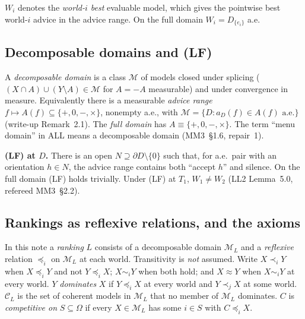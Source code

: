 \documentclass[11pt]{article}
\theoremstyle{definition}
\theoremstyle{remark}
\newcommand{\M}{\mathcal M}
\newcommand{\C}{\mathcal C}
\newcommand{\src}[1]{\textsf{#1}}
\begin{document}
$W_i$ denotes the \emph{world-$i$ best} evaluable model, which gives the pointwise best world-$i$ advice in the advice range. On the full domain $W_i=D_{\{e_i\}}$ a.e.

\subsection{Decomposable domains and (LF)}
A \emph{decomposable domain} is a class $\M$ of models closed under splicing ($(X\cap A)\cup(Y\setminus A)\in\M$ for $A=-A$ measurable) and under convergence in measure. Equivalently there is a measurable \emph{advice range} $f\mapsto A(f)\subseteq\{+,0,-,\times\}$, nonempty a.e., with $\M=\{D:a_D(f)\in A(f)\text{ a.e.}\}$ (write-up Remark~2.1). The \emph{full domain} has $A\equiv\{+,0,-,\times\}$. The term ``menu domain'' in \src{ALL} means a decomposable domain (\src{MM3}~\S1.6, repair~1).

\textbf{(LF) at $D$.} There is an open $N\supseteq\partial D\setminus\{0\}$ such that, for a.e.\ pair with an orientation $h\in N$, the advice range contains both ``accept $h$'' and silence. On the full domain (LF) holds trivially. Under (LF) at $T_1$, $W_1\ne W_2$ (\src{LL2} Lemma~5.0, refereed \src{MM3}~\S2.2).

\subsection{Rankings as reflexive relations, and the axioms}
In this note a \emph{ranking} $L$ consists of a decomposable domain $\M_L$ and a \emph{reflexive} relation $\preceq_i$ on $\M_L$ at each world. Transitivity is \emph{not} assumed. Write $X\prec_iY$ when $X\preceq_iY$ and not $Y\preceq_iX$; $X\sim_iY$ when both hold; and $X\approx Y$ when $X\sim_iY$ at every world. $Y$ \emph{dominates} $X$ if $Y\preceq_iX$ at every world and $Y\prec_jX$ at some world. $\C_L$ is the set of coherent models in $\M_L$ that no member of $\M_L$ dominates. $C$ is \emph{competitive on} $S\subseteq\Omega$ if every $X\in\M_L$ has some $i\in S$ with $C\preceq_iX$.
\end{document}
